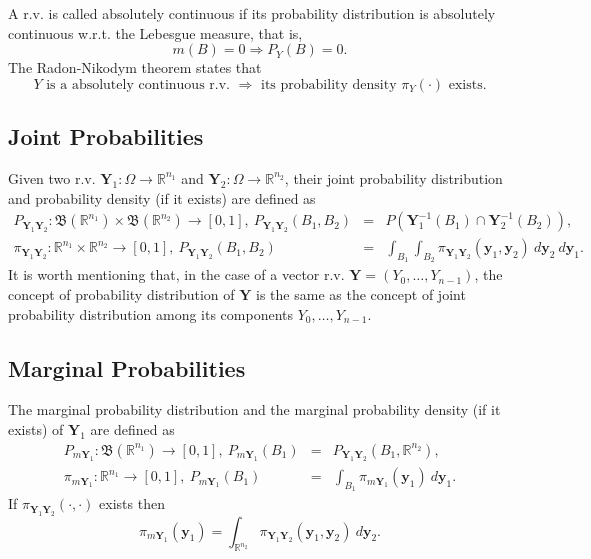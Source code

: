 A r.v. is called absolutely continuous if its probability distribution is absolutely continuous w.r.t. the Lebesgue measure, that is,
\begin{equation*}
m(B) = 0 \Rightarrow P_Y(B) = 0.
\end{equation*}
The Radon-Nikodym theorem \cite{KaSo05} states that
\begin{equation}\label{eq-radon-nik}
Y\mbox{ is a absolutely continuous r.v. }\Rightarrow\mbox{ its probability density }\pi_Y(\cdot)\mbox{ exists}.
\end{equation}

\subsection{Joint Probabilities}

Given two r.v. $\mathbf{Y}_1:\Omega\rightarrow\mathbb{R}^{n_1}$ and $\mathbf{Y}_2:\Omega\rightarrow\mathbb{R}^{n_2}$,
their joint probability distribution and probability density (if it exists) are defined as
\begin{eqnarray*}
P_{\mathbf{Y}_1\mathbf{Y}_2}:\mathfrak{B}(\mathbb{R}^{n_1})\times\mathfrak{B}(\mathbb{R}^{n_2})\rightarrow [0,1],~
P_{\mathbf{Y}_1\mathbf{Y}_2}(B_1,B_2)
& = &
P(\mathbf{Y}_1^{-1}(B_1)\cap\mathbf{Y}_2^{-1}(B_2)), \\
\pi_{\mathbf{Y}_1\mathbf{Y}_2}:\mathbb{R}^{n_1}\times\mathbb{R}^{n_2}\rightarrow [0,1],~
P_{\mathbf{Y}_1\mathbf{Y}_2}(B_1,B_2)
& = &
\int_{B_1}\int_{B_2}\pi_{\mathbf{Y}_1\mathbf{Y}_2}(\mathbf{y}_1,\mathbf{y}_2)~d\mathbf{y}_2~d\mathbf{y}_1.
\end{eqnarray*}
It is worth mentioning that, in the case of a vector r.v. $\mathbf{Y}=(Y_0,\ldots,Y_{n-1})$,
the concept of probability distribution of $\mathbf{Y}$ is the same as
the concept of joint probability distribution among its components $Y_0,\ldots,Y_{n-1}$.

\subsection{Marginal Probabilities}

The marginal probability distribution and the marginal probability density (if it exists) of $\mathbf{Y}_1$ are defined as
\begin{eqnarray*}
P_{m\mathbf{Y}_1}:\mathfrak{B}(\mathbb{R}^{n_1})\rightarrow [0,1],~
P_{m\mathbf{Y}_1}(B_1)
& = &
P_{\mathbf{Y}_1\mathbf{Y}_2}(B_1,\mathbb{R}^{n_2}), \\
\pi_{m\mathbf{Y}_1}:\mathbb{R}^{n_1}\rightarrow [0,1],~
P_{m\mathbf{Y}_1}(B_1)
& = &
\int_{B_1}\pi_{m\mathbf{Y}_1}(\mathbf{y}_1)~d\mathbf{y}_1.
\end{eqnarray*}
%
If $\pi_{\mathbf{Y}_1\mathbf{Y}_2}(\cdot,\cdot)$ exists then
\begin{equation*}
\pi_{m\mathbf{Y}_1}(\mathbf{y}_1)
=
\int_{\mathbb{R}^{n_2}}\pi_{\mathbf{Y}_1\mathbf{Y}_2}(\mathbf{y}_1,\mathbf{y}_2)~d\mathbf{y}_2.
\end{equation*}

